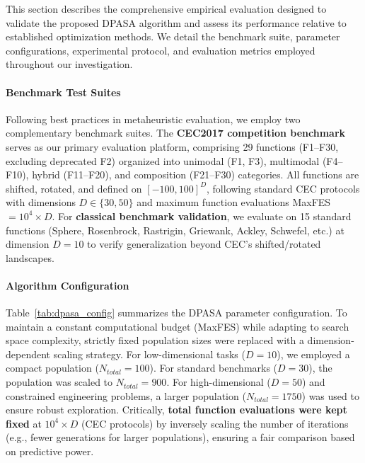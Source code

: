 \documentclass[11pt]{article}
\begin{document}
This section describes the comprehensive empirical evaluation designed to validate the proposed DPASA algorithm and assess its performance relative to established optimization methods. We detail the benchmark suite, parameter configurations, experimental protocol, and evaluation metrics employed throughout our investigation.

\paragraph{Benchmark Test Suites} Following best practices in metaheuristic evaluation, we employ two complementary benchmark suites. The \textbf{CEC2017 competition benchmark}~\citep{awad2017cec} serves as our primary evaluation platform, comprising 29 functions (F1--F30, excluding deprecated F2) organized into unimodal (F1, F3), multimodal (F4--F10), hybrid (F11--F20), and composition (F21--F30) categories. All functions are shifted, rotated, and defined on $[-100, 100]^D$, following standard CEC protocols with dimensions $D \in \{30, 50\}$ and maximum function evaluations MaxFES $= 10^4 \times D$. For \textbf{classical benchmark validation}, we evaluate on 15 standard functions (Sphere, Rosenbrock, Rastrigin, Griewank, Ackley, Schwefel, etc.) at dimension $D = 10$ to verify generalization beyond CEC's shifted/rotated landscapes.

\paragraph{Algorithm Configuration} Table~\ref{tab:dpasa_config} summarizes the DPASA parameter configuration. To maintain a constant computational budget (MaxFES) while adapting to search space complexity, strictly fixed population sizes were replaced with a dimension-dependent scaling strategy. For low-dimensional tasks ($D=10$), we employed a compact population ($N_{total}=100$). For standard benchmarks ($D=30$), the population was scaled to $N_{total}=900$. For high-dimensional ($D=50$) and constrained engineering problems, a larger population ($N_{total}=1750$) was used to ensure robust exploration. Critically, \textbf{total function evaluations were kept fixed} at $10^4 \times D$ (CEC protocols) by inversely scaling the number of iterations (e.g., fewer generations for larger populations), ensuring a fair comparison based on predictive power.
\end{document}
